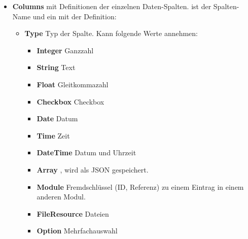 \begin{itemize}
\begin{itemize}
                    \end{itemize}
                \item \textbf{Columns}
                     mit Definitionen der einzelnen Daten-Spalten.
                     ist der Spalten-Name und  ein  mit der Definition:
                    \begin{itemize}
                        \item \textbf{Type}  Typ der Spalte. Kann folgende Werte annehmen:
                            \begin{itemize}
                                \item \textbf{Integer} Ganzzahl
                                \item \textbf{String} Text
                                \item \textbf{Float} Gleitkommazahl
                                \item \textbf{Checkbox} Checkbox
                                \item \textbf{Date} Datum
                                \item \textbf{Time} Zeit
                                \item \textbf{DateTime} Datum und Uhrzeit
                                \item \textbf{Array} , wird als JSON gespeichert.
                                \item \textbf{Module} Fremdschlüssel (ID, Referenz) zu einem Eintrag in einem anderen Modul.
                                \item \textbf{FileResource} Dateien
                                \item \textbf{Option} Mehrfachauswahl


\end{itemize}
\end{itemize}
\end{itemize}

